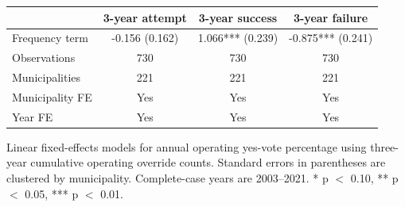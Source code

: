\begin{center}
\scriptsize
\begin{tabular}{lccc}
\toprule
 & 3-year attempt & 3-year success & 3-year failure \\
\midrule
Frequency term & -0.156 (0.162) & 1.066*** (0.239) & -0.875*** (0.241) \\
Observations & 730 & 730 & 730 \\
Municipalities & 221 & 221 & 221 \\
Municipality FE & Yes & Yes & Yes \\
Year FE & Yes & Yes & Yes \\
\bottomrule
\end{tabular}
\vspace{0.05cm}
\parbox{0.94\textwidth}{\tiny Linear fixed-effects models for annual operating yes-vote percentage using three-year cumulative operating override counts. Standard errors in parentheses are clustered by municipality. Complete-case years are 2003--2021. * p $<$ 0.10, ** p $<$ 0.05, *** p $<$ 0.01.}
\end{center}
